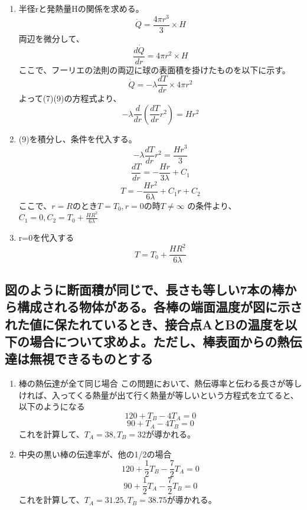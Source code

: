 \documentclass[a4j,twoside,openright,11pt]{jarticle}
\begin{document}
\begin{enumerate}
\item 半径rと発熱量Hの関係を求める。
\begin{equation}
\dot Q = \frac{4\pi r^3}{3} \times H
\end{equation}
両辺を微分して、
\begin{equation}
\frac{d\dot Q}{dr} = 4\pi r^2 \times H
\end{equation}
ここで、フーリエの法則の両辺に球の表面積を掛けたものを以下に示す。
\begin{equation}
\dot Q =  -\lambda \frac{dT}{dr} \times 4\pi r^2
\end{equation}
よって(7)(9)の方程式より、
\begin{equation}
-\lambda \frac{d}{dr}(\frac{dT}{dr} r^2) = Hr^2
\end{equation}

\item (9)を積分し、条件を代入する。
\begin{equation}
-\lambda \frac{dT}{dr} r^2= \frac{Hr^3}{3}
\end{equation}
\begin{equation}
\frac{dT}{dr}= -\frac{Hr}{3\lambda}+C_1
\end{equation}
\begin{equation}
T= -\frac{Hr^2}{6\lambda}+C_1r+C_2
\end{equation}
ここで、$r=RのときT=T_0,r=0の時T\neq \infty$ の条件より、$C_1=0,C_2=T_0 + \frac{HR^2}{6\lambda}$
\item r=0を代入する\\
\begin{equation}
T=T_0 + \frac{HR^2}{6\lambda}
\end{equation}
\end{enumerate}

\subsection{図のように断面積が同じで、長さも等しい7本の棒から構成される物体がある。各棒の端面温度が図に示された値に保たれているとき、接合点AとBの温度を以下の場合について求めよ。ただし、棒表面からの熱伝達は無視できるものとする}
\begin{enumerate}
\item 棒の熱伝達が全て同じ場合
この問題において、熱伝導率と伝わる長さが等しければ、入ってくる熱量が出て行く熱量が等しいという方程式を立てると、以下のようになる
\begin{equation}
120+T_B-4T_A=0
\end{equation}
\begin{equation}
90+T_A-4T_B=0
\end{equation}
これを計算して、$T_A=38,T_B=32$が導かれる。
\item 中央の黒い棒の伝達率が、他の1/2の場合
\begin{equation}
120+\frac{1}{2}T_B-\frac{7}{2}T_A=0
\end{equation}
\begin{equation}
90+\frac{1}{2}T_A-\frac{7}{2}T_B=0
\end{equation}
これを計算して、$T_A=31.25,T_B=38.75$が導かれる。

\end{enumerate}
\end{document}
